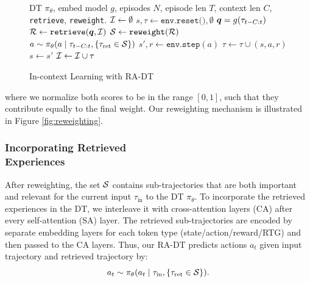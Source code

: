 \documentclass{article} %
\begin{document}
\renewcommand{\algorithmicensure}{\textbf{Output:}}
\renewcommand{\algorithmicrequire}{\textbf{Input:}}
\renewcommand{\algorithmiccomment}[1]{$\triangleright$ #1}
\begin{figure}
\begin{minipage}{0.53\textwidth}
\vspace{-0.8cm}
\begin{algorithm}[H]
\caption{In-context Learning with RA-DT}
\label{alg:radt-inference}
  \begin{algorithmic}[1]
    \REQUIRE DT $\pi_{\theta}$, embed model $g$, episodes $N$, episode len $T$, context len $C$, \texttt{retrieve}, \texttt{reweight}.
    \STATE $\mathcal{I} \gets \emptyset$ \hfill{}
        \STATE $s, \tau \gets \texttt{env.reset()}, \emptyset$
            \STATE $\bm{q} = g(\tau_{t-C:t})$ \hfill{}
            \STATE $\mathcal{R} \gets \text{\texttt{retrieve}}(\bm{q}, \mathcal{I})$ \hfill{}
            \STATE $\mathcal{S} \gets \text{\texttt{reweight}}(\mathcal{R})$ \hfill{}
            \STATE $a \sim \pi_{\theta} (a \mid \tau_{t-C:t}, \{\tau_{\text{ret}} \in \mathcal{S}\} )$ \hfill{}
            \STATE $s', r \gets \texttt{env.step}(a)$
            \STATE $\tau \gets \tau \cup (s,a,r)$ \hfill{}
            \STATE $s \gets s'$ 
        \ENDFOR
        \STATE $\mathcal{I} \gets \mathcal{I} \cup \tau$\hfill{}
    \ENDFOR
  \end{algorithmic}
\end{algorithm}
\end{minipage}
\end{figure}

where we normalize both scores to be in the range $[0, 1]$, such that they contribute equally to the final weight.
Our reweighting mechanism is illustrated in Figure \ref{fig:reweighting}.


\subsubsection{Incorporating Retrieved \\Experiences}
After reweighting, the set $\mathcal{S}$ contains sub-trajectories that are both important and relevant for the current input $\tau_{\text{in}}$ to the DT $\pi_\theta$.
To incorporate the retrieved experiences in the DT, we interleave it with cross-attention layers (CA) after every self-attention (SA) layer. 
The retrieved sub-trajectories are encoded by separate embedding layers for each token type (state/action/reward/RTG) and then passed to the CA layers. 
Thus, our RA-DT predicts actions $a_t$ given input trajectory and retrieved trajectory by:
\begin{equation}\label{eq:predict}
    a_t \sim \pi_{\theta} (a_t \mid \tau_{\text{in}}, \{\tau_{\text{ret}} \in \mathcal{S}\}).
\end{equation}
\end{document}
